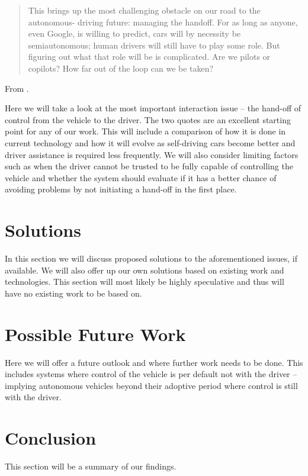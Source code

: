 \documentclass{acm_proc_article-sp}
\begin{document}
\begin{quote}
This brings up the most challenging obstacle on our road to the autonomous- driving future: managing the handoff.
For as long as anyone, even Google, is willing to predict, cars will by necessity be semiautonomous; human drivers will still have to play some role.
But figuring out what that role will be is complicated.
Are we pilots or copilots? How far out of the loop can we be taken?
\end{quote}
From \cite{www:wired}.

Here we will take a look at the most important interaction issue – the hand-off of control from the vehicle to the driver.
The two quotes are an excellent starting point for any of our work.
This will include a comparison of how it is done in current technology and how it will evolve as self-driving cars become better and driver assistance is required less frequently.
We will also consider limiting factors such as when the driver cannot be trusted to be fully capable of controlling the vehicle and whether the system should evaluate if it has a better chance of avoiding problems by not initiating a hand-off in the first place.

\section{Solutions}

In this section we will discuss proposed solutions to the aforementioned issues, if available.
We will also offer up our own solutions based on existing work and technologies.
This section will most likely be highly speculative and thus will have no existing work to be based on.

\section{Possible Future Work}

Here we will offer a future outlook and where further work needs to be done.
This includes systems where control of the vehicle is per default not with the driver – implying autonomous vehicles beyond their adoptive period where control is still with the driver.

\section{Conclusion}

This section will be a summary of our findings.


  

\balancecolumns
\end{document}
